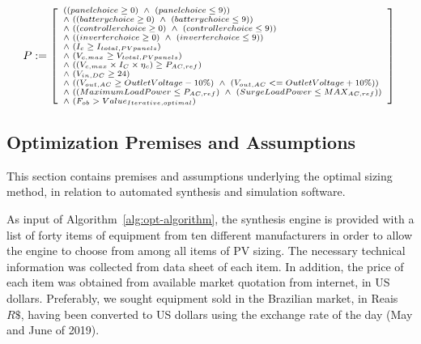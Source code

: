 \begin{equation}              
\label{eq:quant_free_formulae_p}
\begin{scriptsize}
P := \left [ \begin{array}{ll} 
	((panelchoice \geq 0) \, \, \wedge \, \, (panelchoice \leq 9)) \\
	\wedge \, \, ((batterychoice \geq 0) \, \, \wedge \, \, (batterychoice \leq 9)) \\
	\wedge \, \, ((controllerchoice \geq 0) \, \, \wedge \, \, (controllerchoice \leq 9)) \\
	\wedge \, \, ((inverterchoice \geq 0) \, \, \wedge \, \, (inverterchoice \leq 9)) \\
	\wedge \, \, (I_{c} \geq I_{total,PVpanels}) \\
	\wedge \, \, (V_{c,max} \geq V_{total,PVpanels}) \\
	\wedge \, \, ((V_{c,max} \times I_{C} \times \eta_{c}) \geq P_{AC,ref}) \\
	\wedge \, \, (V_{in,DC} \geq 24)  \\
	\wedge \, \, ((V_{out,AC} \geq OutletVoltage-10\%) \, \, \wedge \, \, (V_{out,AC} <= OutletVoltage+10\%)) \\
	\wedge \, \, ((MaximumLoadPower \leq P_{AC,ref}) \, \, \wedge \, \, (SurgeLoadPower \leq MAX_{AC,ref})) \\
	\wedge \, \, (F_{ob} > Value_{Iterative,optimal}) \\
              \end{array} \right ]  \\
\end{scriptsize}
\end{equation}

\subsection{Optimization Premises and Assumptions}
\label{sec:OptAssumptions}

This section contains premises and assumptions underlying the optimal sizing method, in relation to automated synthesis and simulation software.

As input of Algorithm~\ref{alg:opt-algorithm}, the synthesis engine is provided with a list of forty items of equipment from ten different manufacturers in order to allow the engine to choose from among all items of PV sizing. The necessary technical information was collected from data sheet of each item. In addition, the price of each item was obtained from available market quotation from internet, in US dollars. Preferably, we sought equipment sold in the Brazilian market, in Reais $R\$$, having been converted to US dollars using the exchange rate of the day (May and June of 2019).

